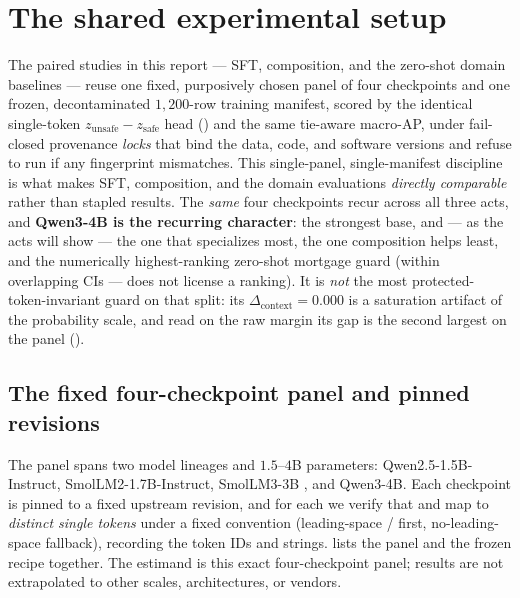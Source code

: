 \section{The shared experimental setup}
\label{sec:setup}

The paired studies in this report --- SFT, composition, and the zero-shot domain baselines --- reuse one fixed, purposively chosen panel of four checkpoints and one
frozen, decontaminated $1{,}200$-row training manifest, scored by the identical single-token
$z_{\text{unsafe}}-z_{\text{safe}}$ head () and the same tie-aware macro-AP, under
fail-closed provenance \emph{locks} that bind the data, code, and software versions and refuse to run
if any fingerprint mismatches. This single-panel, single-manifest discipline is what makes SFT,
composition, and the domain evaluations \emph{directly comparable} rather than stapled
results. The \emph{same} four checkpoints recur across all three acts, and \textbf{Qwen3-4B is the
recurring character}: the strongest base, and --- as the acts will show --- the one that specializes
most, the one composition helps least, and the numerically highest-ranking zero-shot mortgage guard
(within overlapping CIs ---  does not license a ranking). It is \emph{not} the most
protected-token-invariant guard on that split: its $\Delta_{\mathrm{context}}=0.000$ is a saturation
artifact of the probability scale, and read on the raw margin its gap is the second largest on the panel
().

\subsection{The fixed four-checkpoint panel and pinned revisions}
\label{sec:setup-panel}

The panel spans two model lineages and $1.5$--$4$B parameters: Qwen2.5-1.5B-Instruct,
SmolLM2-1.7B-Instruct, SmolLM3-3B \citep{bakouch2025smollm3}, and Qwen3-4B. Each checkpoint is pinned to
a fixed upstream revision, and for each we verify that  and  map to
\emph{distinct single tokens} under a fixed convention (leading-space /
first, no-leading-space fallback), recording the token IDs and strings.  lists
the panel and the frozen recipe together. The estimand is this exact four-checkpoint panel; results are
not extrapolated to other scales, architectures, or vendors.

